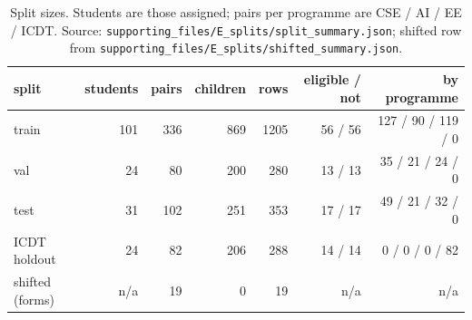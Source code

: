 \documentclass[11pt,a4paper]{article}
\newcommand{\f}[1]{\nolinkurl{#1}}
\newcommand{\nforms}{19}
\begin{document}
\begin{table}[!h]
\centering\small
\caption{Split sizes. Students are those assigned; pairs per programme are CSE / AI / EE / ICDT. Source:
\f{supporting_files/E_splits/split_summary.json}; shifted row from \f{supporting_files/E_splits/shifted_summary.json}.}\label{tab:split}
\begin{tabular}{@{}lrrrrrr@{}}
\toprule
split & students & pairs & children & rows & eligible / not & by programme \\
\midrule
train & 101 & 336 & 869 & 1205 & 56 / 56 & 127 / 90 / 119 / 0 \\
val & 24 & 80 & 200 & 280 & 13 / 13 & 35 / 21 / 24 / 0 \\
test & 31 & 102 & 251 & 353 & 17 / 17 & 49 / 21 / 32 / 0 \\
ICDT holdout & 24 & 82 & 206 & 288 & 14 / 14 & 0 / 0 / 0 / 82 \\
shifted (forms) & n/a & \nforms{} & 0 & \nforms{} & n/a & n/a \\
\bottomrule
\end{tabular}
\end{table}
\end{document}
